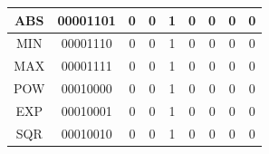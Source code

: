 \documentclass[a4paper,14pt]{article}
\begin{document}
\begin{table}[!h]
\begin{tabular}{lllllllll}
\multicolumn{1}{|c|}{ABS} & \multicolumn{1}{c|}{00001101} & \multicolumn{1}{c|}{0} & \multicolumn{1}{c|}{0} & \multicolumn{1}{c|}{1} & \multicolumn{1}{c|}{0} & \multicolumn{1}{c|}{0} & \multicolumn{1}{c|}{0} & \multicolumn{1}{c|}{0} \TBstrut \\[1em] \hline
\multicolumn{1}{|c|}{MIN} & \multicolumn{1}{c|}{00001110} & \multicolumn{1}{c|}{0} & \multicolumn{1}{c|}{0} & \multicolumn{1}{c|}{1} & \multicolumn{1}{c|}{0} & \multicolumn{1}{c|}{0} & \multicolumn{1}{c|}{0} & \multicolumn{1}{c|}{0} \TBstrut \\[1em] \hline
\multicolumn{1}{|c|}{MAX} & \multicolumn{1}{c|}{00001111} & \multicolumn{1}{c|}{0} & \multicolumn{1}{c|}{0} & \multicolumn{1}{c|}{1} & \multicolumn{1}{c|}{0} & \multicolumn{1}{c|}{0} & \multicolumn{1}{c|}{0} & \multicolumn{1}{c|}{0} \TBstrut \\[1em] \hline
\multicolumn{1}{|c|}{POW} & \multicolumn{1}{c|}{00010000} & \multicolumn{1}{c|}{0} & \multicolumn{1}{c|}{0} & \multicolumn{1}{c|}{1} & \multicolumn{1}{c|}{0} & \multicolumn{1}{c|}{0} & \multicolumn{1}{c|}{0} & \multicolumn{1}{c|}{0} \TBstrut \\[1em] \hline
\multicolumn{1}{|c|}{EXP} & \multicolumn{1}{c|}{00010001} & \multicolumn{1}{c|}{0} & \multicolumn{1}{c|}{0} & \multicolumn{1}{c|}{1} & \multicolumn{1}{c|}{0} & \multicolumn{1}{c|}{0} & \multicolumn{1}{c|}{0} & \multicolumn{1}{c|}{0} \TBstrut \\[1em] \hline
\multicolumn{1}{|c|}{SQR} & \multicolumn{1}{c|}{00010010} & \multicolumn{1}{c|}{0} & \multicolumn{1}{c|}{0} & \multicolumn{1}{c|}{1} & \multicolumn{1}{c|}{0} & \multicolumn{1}{c|}{0} & \multicolumn{1}{c|}{0} & \multicolumn{1}{c|}{0} \TBstrut \\[1em] \hline


\end{tabular}
\end{table}
\end{document}
